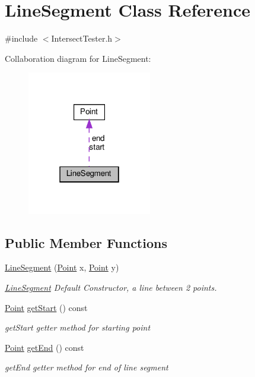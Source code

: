 \hypertarget{class_line_segment}{}\section{Line\+Segment Class Reference}
\label{class_line_segment}


{\ttfamily \#include $<$Intersect\+Tester.\+h$>$}



Collaboration diagram for Line\+Segment\+:\nopagebreak
\begin{figure}[H]
\begin{center}
\leavevmode
\includegraphics[width=154pt]{class_line_segment__coll__graph}
\end{center}
\end{figure}
\subsection*{Public Member Functions}
\begin{DoxyCompactItemize}
\item 
\hyperlink{class_line_segment_ad006d80e0d72c31734ff22d6c9dfed3d}{Line\+Segment} (\hyperlink{class_point}{Point} x, \hyperlink{class_point}{Point} y)
\begin{DoxyCompactList}\small\item\em \hyperlink{class_line_segment}{Line\+Segment} Default Constructor, a line between 2 points. \end{DoxyCompactList}\item 
\hyperlink{class_point}{Point} \hyperlink{class_line_segment_afcff6bd5f6a3073a44f7b21db0be876f}{get\+Start} () const
\begin{DoxyCompactList}\small\item\em get\+Start getter method for starting point \end{DoxyCompactList}\item 
\hyperlink{class_point}{Point} \hyperlink{class_line_segment_a7b05f883c369b950e61009edfafbbd0e}{get\+End} () const
\begin{DoxyCompactList}\small\item\em get\+End getter method for end of line segment \end{DoxyCompactList}\end{DoxyCompactItemize}
